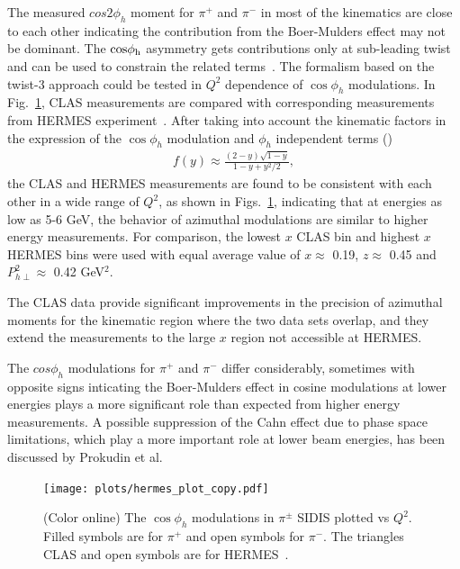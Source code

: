 \documentclass[aps,prl,twocolumn,showpacs,superscriptaddress,groupedaddress]{revtex4-1}  %
\newcommand{\Phperp}{P_{h\perp}}
\newcommand{\xbj}{x}
\begin{document}
The measured $cos 2 \phi_h$ moment for $\pi^+$ and $\pi^-$ in most of the kinematics are close to each other indicating the contribution from the Boer-Mulders effect may not be dominant.
The $\rm cos \phi_h$ asymmetry gets contributions only at sub-leading twist and can be used to constrain the related terms~\cite{Cahn:1978se,Anselmino:2005nn,Berger:1979xz}.
The formalism based on the twist-3 approach could be tested in $Q^2$ dependence of $\cos\phi_h$ modulations.  In Fig.~\ref{fig:clas-hermes}, CLAS measurements are compared with corresponding measurements from HERMES experiment~\cite{Airapetian:2012yg}.
After taking into account the kinematic factors in the expression
of the $\cos\phi_h$ modulation and $\phi_h$ independent terms (\cite{Bacchetta:2006tn})
\begin{eqnarray}
f(y)\approx \frac{(2-y)\sqrt{1-y}}{1-y+y^{2}/2} ,
\label{fy}
\end{eqnarray}
the CLAS and HERMES measurements are found to 
be consistent with each other in a wide range of $Q^2$, as shown in Figs.~\ref{fig:clas-hermes}, indicating that at energies as low as 5-6 GeV, the
behavior of azimuthal modulations are similar to higher energy measurements. 
For comparison, the lowest $\xbj$ CLAS bin and highest $\xbj$ HERMES bins were used with equal average value of $\xbj\approx$ 0.19, $z\approx$ 0.45 and $\Phperp^2 \approx$ 0.42 GeV$^2$.

The CLAS data provide significant improvements in the precision of azimuthal moments for the kinematic region where the two data sets overlap, and they extend the measurements to the large $\xbj$ region not accessible at HERMES.

The $cos \phi_h$ modulations for $\pi^+$ and $\pi^-$ differ considerably, sometimes with opposite signs inticating the Boer-Mulders effect in cosine modulations at lower energies plays a more significant role than expected from higher energy measurements.
A possible suppression of the Cahn effect due to phase space limitations, which play a more important role at lower beam energies, has been discussed by Prokudin et al.
\begin{figure}[h]
\begin{center}
\texttt{[image: plots/hermes\_plot\_copy.pdf]}
\end{center}
\caption{(Color online) The $\cos\phi_h$ modulations in $\pi^\pm$ SIDIS plotted vs $Q^2$. Filled symbols are for $\pi^+$ and open symbols for $\pi^-$.
The triangles CLAS and open symbols are for HERMES~\cite{Airapetian:2012yg}.}
\label{fig:clas-hermes}
\end{figure}
\end{document}
